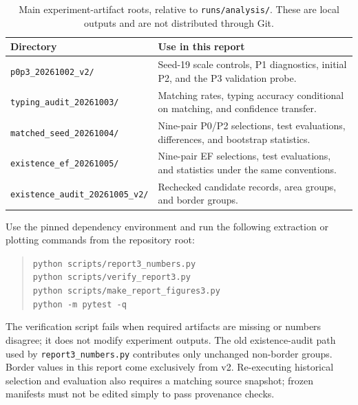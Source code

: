 \documentclass[11pt,a4paper]{article}
\newcommand{\code}[1]{\nolinkurl{#1}}
\begin{document}
\begin{table}[H]
\centering\footnotesize
\caption{Main experiment-artifact roots, relative to \code{runs/analysis/}. These are local outputs and are not distributed through Git.}
\begin{tabularx}{\linewidth}{lY}\toprule
Directory & Use in this report\\\midrule
\code{p0p3_20261002_v2/} & Seed-19 scale controls, P1 diagnostics, initial P2, and the P3 validation probe.\\
\code{typing_audit_20261003/} & Matching rates, typing accuracy conditional on matching, and confidence transfer.\\
\code{matched_seed_20261004/} & Nine-pair P0/P2 selections, test evaluations, differences, and bootstrap statistics.\\
\code{existence_ef_20261005/} & Nine-pair EF selections, test evaluations, and statistics under the same conventions.\\
\code{existence_audit_20261005_v2/} & Rechecked candidate records, area groups, and border groups.\\\bottomrule
\end{tabularx}
\end{table}

Use the pinned dependency environment and run the following extraction or plotting commands from the repository root:
\begin{quote}\small
\code{python scripts/report3_numbers.py}\\
\code{python scripts/verify_report3.py}\\
\code{python scripts/make_report_figures3.py}\\
\code{python -m pytest -q}
\end{quote}
The verification script fails when required artifacts are missing or numbers disagree; it does not modify experiment outputs. The old existence-audit path used by \code{report3_numbers.py} contributes only unchanged non-border groups. Border values in this report come exclusively from v2. Re-executing historical selection and evaluation also requires a matching source snapshot; frozen manifests must not be edited simply to pass provenance checks.
\end{document}

